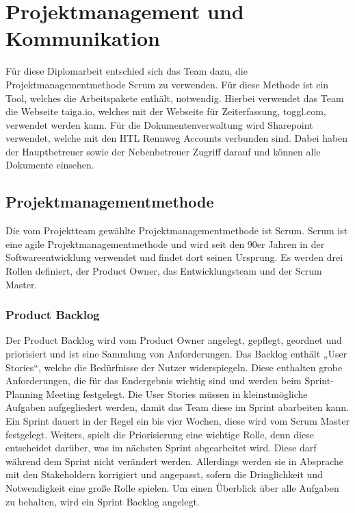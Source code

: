 \section{Projektmanagement und Kommunikation}

Für diese Diplomarbeit entschied sich das Team dazu, die Projektmanagementmethode Scrum zu verwenden. Für diese Methode ist ein Tool, welches die Arbeitspakete enthält, notwendig. Hierbei verwendet das Team die Webseite taiga.io, welches mit der Webseite für Zeiterfassung, toggl.com, verwendet werden kann. Für die Dokumentenverwaltung wird Sharepoint verwendet, welche mit den HTL Rennweg Accounts verbunden sind. Dabei haben der Hauptbetreuer sowie der Nebenbetreuer Zugriff darauf und können alle Dokumente einsehen.

\subsection{Projektmanagementmethode} 

Die vom Projektteam gewählte Projektmanagementmethode ist Scrum. Scrum ist eine agile Projektmanagementmethode und wird seit den 90er Jahren in der Softwareentwicklung verwendet und findet dort seinen Ursprung. Es werden drei Rollen definiert, der Product Owner, das Entwicklungsteam und der Scrum Master. \cite{scrum}

\subsubsection{Product Backlog} 
Der Product Backlog wird vom Product Owner angelegt, gepflegt, geordnet und priorisiert und ist eine Sammlung von Anforderungen. Das Backlog enthält „User Stories“, welche die Bedürfnisse der Nutzer widerspiegeln. Diese enthalten grobe Anforderungen, die für das Endergebnis wichtig sind und werden beim Sprint-Planning Meeting festgelegt. Die User Stories müssen in kleinstmögliche Aufgaben aufgegliedert werden, damit das Team diese im Sprint abarbeiten kann. Ein Sprint dauert in der Regel ein bis vier Wochen, diese wird vom Scrum Master festgelegt. Weiters, spielt die Priorisierung eine wichtige Rolle, denn diese entscheidet darüber, was im nächsten Sprint abgearbeitet wird. Diese darf während dem Sprint nicht verändert werden. Allerdings werden sie in Absprache mit den Stakeholdern korrigiert und angepasst, sofern die Dringlichkeit und Notwendigkeit eine große Rolle spielen. Um einen Überblick über alle Aufgaben zu behalten, wird ein Sprint Backlog angelegt. \cite{productbacklog}

